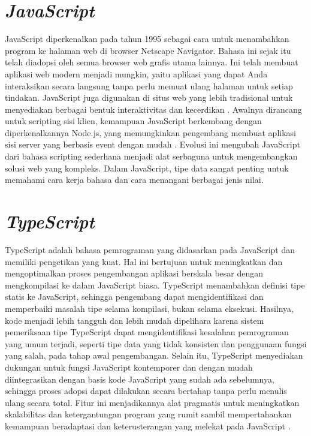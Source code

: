 \section{\textit{JavaScript}}
JavaScript diperkenalkan pada tahun 1995 sebagai cara untuk menambahkan program ke halaman web di browser Netscape Navigator. Bahasa ini sejak itu telah diadopsi oleh semua browser web grafis utama lainnya. Ini telah membuat aplikasi web modern menjadi mungkin, yaitu aplikasi yang dapat Anda interaksikan secara langsung tanpa perlu memuat ulang halaman untuk setiap tindakan. JavaScript juga digunakan di situs web yang lebih tradisional untuk menyediakan berbagai bentuk interaktivitas dan kecerdikan \citep{haverbeke2024eloquent}. Awalnya dirancang untuk scripting sisi klien, kemampuan JavaScript berkembang dengan diperkenalkannya Node.js, yang memungkinkan pengembang membuat aplikasi sisi server yang berbasis event dengan mudah \citep{jartarghar2022react}. Evolusi ini mengubah JavaScript dari bahasa scripting sederhana menjadi alat serbaguna untuk mengembangkan solusi web yang kompleks.
Dalam JavaScript, tipe data sangat penting untuk memahami cara kerja bahasa dan cara menangani berbagai jenis nilai.

\section{\textit{TypeScript}}
TypeScript adalah bahasa pemrograman yang didasarkan pada JavaScript dan memiliki pengetikan yang kuat. Hal ini bertujuan untuk meningkatkan dan mengoptimalkan proses pengembangan aplikasi berskala besar dengan mengkompilasi ke dalam JavaScript biasa. TypeScript menambahkan definisi tipe statis ke JavaScript, sehingga pengembang dapat mengidentifikasi dan memperbaiki masalah tipe selama kompilasi, bukan selama eksekusi. Hasilnya, kode menjadi lebih tangguh dan lebih mudah dipelihara karena sistem pemeriksaan tipe TypeScript dapat mengidentifikasi kesalahan pemrograman yang umum terjadi, seperti tipe data yang tidak konsisten dan penggunaan fungsi yang salah, pada tahap awal pengembangan. Selain itu, TypeScript menyediakan dukungan untuk fungsi JavaScript kontemporer dan dengan mudah diintegrasikan dengan basis kode JavaScript yang sudah ada sebelumnya, sehingga proses adopsi dapat dilakukan secara bertahap tanpa perlu menulis ulang secara total. Fitur ini menjadikannya alat pragmatis untuk meningkatkan skalabilitas dan ketergantungan program yang rumit sambil mempertahankan kemampuan beradaptasi dan keterusterangan yang melekat pada JavaScript \citep{typescript2025handbook}.